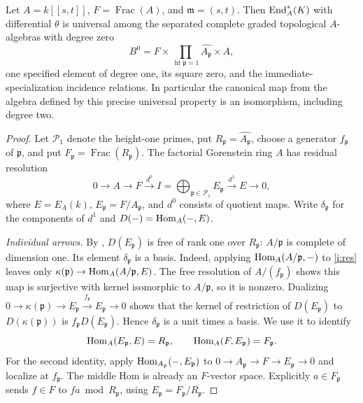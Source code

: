 \begin{theorem}\label{i:surface}
Let $A=k[[s,t]]$, $F=\operatorname{Frac}(A)$, and
$\mathfrak m=(s,t)$. Then $\operatorname{End}_A^*(K)$ with differential $\theta$
is universal among the separated complete graded topological
$A$-algebras with degree zero
\[
 B^0=F\times\prod_{\operatorname{ht}\mathfrak p=1}
                 \widehat{A_{\mathfrak p}}\times A,
\]
one specified element of degree one, its square zero, and the
immediate-specialization incidence relations. In particular the
canonical map from the algebra defined by this precise universal
property is an isomorphism, including degree two.
\end{theorem}
\begin{proof}
Let $\mathcal P_1$ denote the height-one primes, put
$R_{\mathfrak p}=\widehat{A_{\mathfrak p}}$, choose a generator
$f_{\mathfrak p}$ of $\mathfrak p$, and put
$F_{\mathfrak p}=\operatorname{Frac}(R_{\mathfrak p})$.
The factorial Gorenstein ring $A$ has residual resolution
\begin{equation}\label{i:res}
 0\to A\to F\xrightarrow{d^0}
 I=\bigoplus_{\mathfrak p\in\mathcal P_1}E_{\mathfrak p}
 \xrightarrow{d^1}E\to0,
\end{equation}
where $E=E_A(k)$, $E_{\mathfrak p}=F/A_{\mathfrak p}$, and
$d^0$ consists of quotient maps. Write $\delta_{\mathfrak p}$ for
the components of $d^1$ and $D(-)=\operatorname{Hom}_A(-,E)$.

\emph{Individual arrows.}
By \cite[Theorem 1.1, p.~1]{Schenzel2013}, $D(E_{\mathfrak p})$
is free of rank one over $R_{\mathfrak p}$: $A/\mathfrak p$ is
complete of dimension one. Its element $\delta_{\mathfrak p}$ is
a basis. Indeed, applying $\operatorname{Hom}_A(A/\mathfrak p,-)$ to
\eqref{i:res} leaves only
$\kappa(\mathfrak p)\to\operatorname{Hom}_A(A/\mathfrak p,E)$.
The free resolution of $A/(f_{\mathfrak p})$ shows this map is
surjective with kernel isomorphic to $A/\mathfrak p$, so it is
nonzero. Dualizing
$0\to\kappa(\mathfrak p)\to E_{\mathfrak p}
\xrightarrow{f_{\mathfrak p}}E_{\mathfrak p}\to0$
shows that the kernel of restriction of $D(E_{\mathfrak p})$ to
$D(\kappa(\mathfrak p))$ is
$f_{\mathfrak p}D(E_{\mathfrak p})$. Hence
$\delta_{\mathfrak p}$ is a unit times a basis. We use it to identify
\begin{equation}\label{i:arrows}
 \operatorname{Hom}_A(E_{\mathfrak p},E)=R_{\mathfrak p},\qquad
 \operatorname{Hom}_A(F,E_{\mathfrak p})=F_{\mathfrak p}.
\end{equation}
For the second identity, apply $\operatorname{Hom}_{A_{\mathfrak p}}(-,E_{\mathfrak p})$
to $0\to A_{\mathfrak p}\to F\to E_{\mathfrak p}\to0$
and localize at $f_{\mathfrak p}$. The middle Hom is already an
$F$-vector space. Explicitly $a\in F_{\mathfrak p}$ sends
$f\in F$ to $fa\bmod R_{\mathfrak p}$, using
$E_{\mathfrak p}=F_{\mathfrak p}/R_{\mathfrak p}$.


\end{proof}
